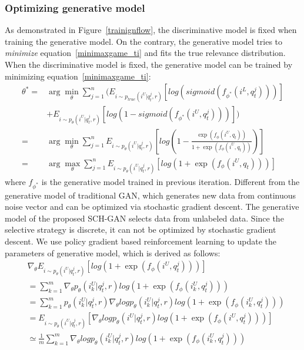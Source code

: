 \documentclass[journal]{IEEEtran}
\begin{document}
\subsubsection{Optimizing generative model}
As demonstrated in Figure~\ref{trainignflow}, the discriminative model is fixed when training the generative model. On the contrary, the generative model tries to \textit{minimize} equation~\ref{minimaxgame_ti} and fits the true relevance distribution. When the discriminative model is fixed, the generative model can be trained by minimizing equation~\ref{minimaxgame_ti}:
\begin{equation}
\label{gen_opt}
\begin{split}
\theta^\ast=&\arg\min_{\theta}\sum_{j=1}^{n}(E_{i\sim p_{true}(i^U|q_t^j,r)}[log(sigmoid(f_{\phi^\ast}(i^L,q_t^j)))]\\
&+E_{i\sim p_{\theta}(i^U|q_t^j,r)}[log(1-sigmoid(f_{\phi^\ast}(i^U,q_t^j)))])\\
=&\arg\min_{\theta}\sum_{j=1}^{n}E_{i\sim p_{\theta}(i^U|q_t^j,r)}[log(1-\frac{\exp(f_\phi(i^U,q_t))}{1+\exp(f_\phi(i^U,q_t))})]\\
=&\arg\max_{\theta}\sum_{j=1}^{n}E_{i\sim p_{\theta}(i^U|q_t^j,r)}[log(1+\exp(f_\phi(i^U,q_t)))]
\end{split}
\end{equation}
where $f_{\phi^\ast}$ is the generative model trained in previous iteration. Different from the generative model of traditional GAN, which generates new data from continuous noise vector and can be optimized via stochastic gradient descent. The generative model of the proposed SCH-GAN selects data from unlabeled data. Since the selective strategy is discrete, it can not be optimized by stochastic gradient descent. We use policy gradient based reinforcement learning to update the parameters of generative model, which is derived as follows:
\begin{equation}
\label{gen_opt_reinforce}
\begin{split}
&\nabla_\theta E_{i\sim p_{\theta}(i^U|q_t^j,r)}[log(1+\exp(f_\phi(i^U,q_t^j)))]\\
&=\sum_{k=1}^{m}\nabla_\theta p_{\theta}(i_k^U|q_t^j,r)log(1+\exp(f_\phi(i_k^U,q_t^j)))\\
&=\sum_{k=1}^{m}p_{\theta}(i_k^U|q_t^j,r)\nabla_\theta logp_{\theta}(i_k^U|q_t^j,r)log(1+\exp(f_\phi(i_k^U,q_t^j)))\\
&=E_{i\sim p_{\theta}(i^U|q_t^j,r)}[\nabla_\theta logp_{\theta}(i^U|q_t^j,r)log(1+\exp(f_\phi(i^U,q_t^j)))]\\
&\simeq \frac{1}{m}\sum_{k=1}^{m}\nabla_\theta logp_{\theta}(i_k^U|q_t^j,r)log(1+\exp(f_\phi(i_k^U,q_t^j)))
\end{split}
\end{equation}
\end{document}
